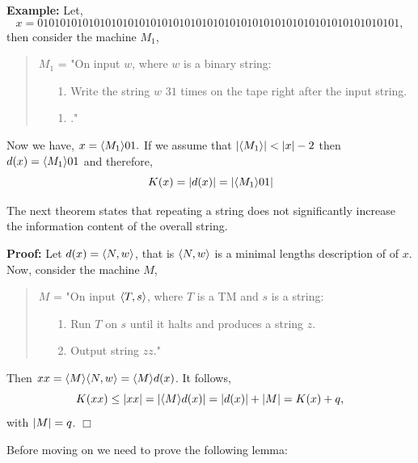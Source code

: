 \documentclass[a4paper,blends,pdf,colorBG,slideColor]{prosper}
\begin{document}
\small
{}
{\bf Example:} Let,
\[
x = 0101010101010101010101010101010101010101010101010101010101010101,
\]
then consider the machine $M_1$,
\begin{quote}
$M_1$ = "On input $w$, where $w$ is a binary string:
\begin{itemize}
\item[1.] Write the string $w$ $31$ times on the tape right after the input string.
\item[1.] \accept."
\end{itemize}
\end{quote}
Now we have,
$
x = \langle {M_1} \rangle01.
$
If we assume that 
$
|\langle {M_1} \rangle| < |x| - 2
$
then $d(x) = \langle {M_1} \rangle01$ and therefore,
\[
K(x) = |d(x)| = |\langle {M_1} \rangle01|
\]
\es

The next theorem states that repeating a string does not significantly increase the information content
of the overall string.


{\bf Proof:} Let $d(x) = \langle {N,w} \rangle$, that is $\langle {N,w} \rangle$ is a minimal lengths description of
of $x$.  Now, consider the machine $M$,
\begin{quote}
$M$ = "On input $\langle {T,s} \rangle$, where $T$ is a TM and $s$ is a string:
\begin{itemize}
\item[1.] Run $T$ on $s$ until it halts and produces a string $z$.
\item[2.] Output string $zz$."
\end{itemize}
\end{quote}
Then $xx = \langle {M} \rangle\langle {N,w} \rangle = \langle {M} \rangle d(x)$.  It follows,
\[
K(xx) \le {|{xx}|} = {|{\langle {M} \rangle d(x)}|} = {|{d(x)}|} + {|{M}|} = K(x) + q,
\]
with ${|{M}|} = q$.
$\Box$
\es

\es

\scriptsize
Before moving on we need to prove the following lemma:
\end{document}
